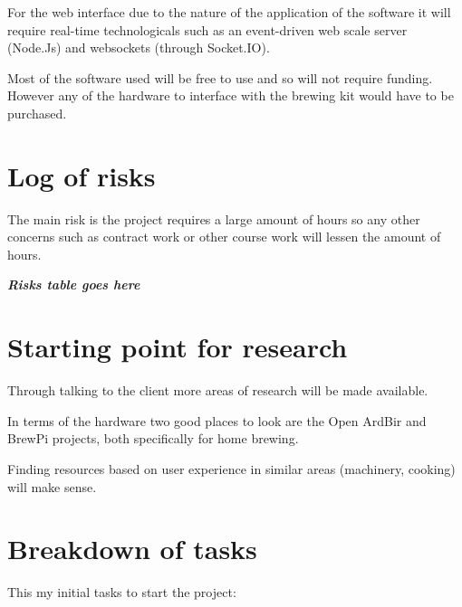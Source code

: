 For the web interface due to the nature of the application of the software it will require real-time technologicals such as an event-driven web scale server (Node.Js) and websockets (through Socket.IO).

Most of the software used will be free to use and so will not require funding. However any of the hardware to interface with the brewing kit would have to be purchased.

\section{Log of risks}

The main risk is the project requires a large amount of hours so any other concerns such as contract work or other course work will lessen the amount of hours.

\textit{\textbf{Risks table goes here}}


\section{Starting point for research}

Through talking to the client more areas of research will be made available.

In terms of the hardware two good places to look are the Open ArdBir and BrewPi projects, both specifically for home brewing.

Finding resources based on user experience in similar areas (machinery, cooking) will make sense.

\section{Breakdown of tasks}

This my initial tasks to start the project:

